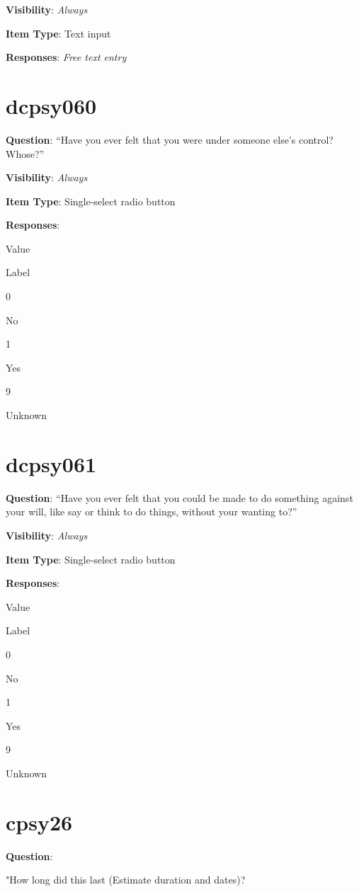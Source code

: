 \documentclass[]{book}
\begin{document}
\textbf{Visibility}: \emph{Always}

\textbf{Item Type}: Text input

\textbf{Responses}: \emph{Free text entry}

\hypertarget{dcpsy060}{%
\section{dcpsy060}\label{dcpsy060}}

\textbf{Question}: ``Have you ever felt that you were under someone else's control? Whose?''

\textbf{Visibility}: \emph{Always}

\textbf{Item Type}: Single-select radio button

\textbf{Responses}:

Value

Label

0

No

1

Yes

9

Unknown

\hypertarget{dcpsy061}{%
\section{dcpsy061}\label{dcpsy061}}

\textbf{Question}: ``Have you ever felt that you could be made to do something against your will, like say or think to do things, without your wanting to?''

\textbf{Visibility}: \emph{Always}

\textbf{Item Type}: Single-select radio button

\textbf{Responses}:

Value

Label

0

No

1

Yes

9

Unknown

\hypertarget{cpsy26}{%
\section{cpsy26}\label{cpsy26}}

\textbf{Question}:

"How long did this last (Estimate duration and dates)?
\end{document}
